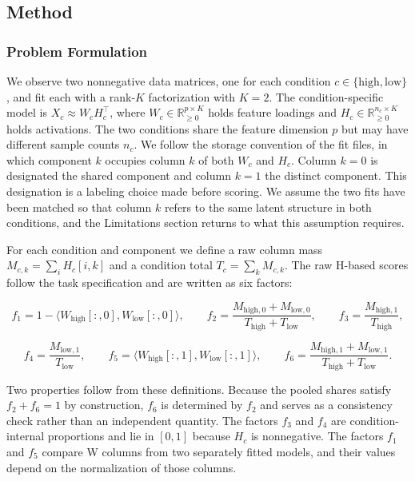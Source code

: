 \documentclass{article}
\begin{document}
\subsection{Method}

\label{sec:method}

\subsubsection{Problem Formulation}

\label{sec:problem_formulation}

We observe two nonnegative data matrices, one for each condition $c \in \{\text{high}, \text{low}\}$, and fit each with a rank-$K$ factorization with $K = 2$. The condition-specific model is $X_c \approx W_c H_c^{\top}$, where $W_c \in \mathbb{R}_{\ge 0}^{p \times K}$ holds feature loadings and $H_c \in \mathbb{R}_{\ge 0}^{n_c \times K}$ holds activations. The two conditions share the feature dimension $p$ but may have different sample counts $n_c$. We follow the storage convention of the fit files, in which component $k$ occupies column $k$ of both $W_c$ and $H_c$. Column $k = 0$ is designated the shared component and column $k = 1$ the distinct component. This designation is a labeling choice made before scoring. We assume the two fits have been matched so that column $k$ refers to the same latent structure in both conditions, and the Limitations section returns to what this assumption requires.

For each condition and component we define a raw column mass $M_{c,k} = \sum_{i} H_c[i,k]$ and a condition total $T_c = \sum_k M_{c,k}$. The raw H-based scores follow the task specification and are written as six factors:

\begin{equation}
f_1 = 1 - \langle W_{\text{high}}[:,0], W_{\text{low}}[:,0]\rangle, \qquad
f_2 = \frac{M_{\text{high},0} + M_{\text{low},0}}{T_{\text{high}} + T_{\text{low}}}, \qquad
f_3 = \frac{M_{\text{high},1}}{T_{\text{high}}},
\end{equation}

\begin{equation}
f_4 = \frac{M_{\text{low},1}}{T_{\text{low}}}, \qquad
f_5 = \langle W_{\text{high}}[:,1], W_{\text{low}}[:,1]\rangle, \qquad
f_6 = \frac{M_{\text{high},1} + M_{\text{low},1}}{T_{\text{high}} + T_{\text{low}}}.
\end{equation}

Two properties follow from these definitions. Because the pooled shares satisfy $f_2 + f_6 = 1$ by construction, $f_6$ is determined by $f_2$ and serves as a consistency check rather than an independent quantity. The factors $f_3$ and $f_4$ are condition-internal proportions and lie in $[0,1]$ because $H_c$ is nonnegative. The factors $f_1$ and $f_5$ compare W columns from two separately fitted models, and their values depend on the normalization of those columns.
\end{document}
